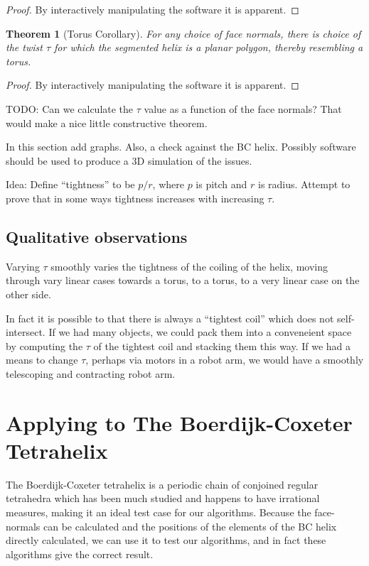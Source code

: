 \documentclass[11pt]{article}
\newtheorem{theorem}{Theorem}
\begin{document}
{\begin{proof}
  By interactively manipulating the software it is apparent.
  \end{proof}

\begin{theorem}[Torus Corollary]
  For any choice of face normals, there is choice of the twist $\tau$ for which the segmented helix is a planar polygon,
  thereby resembling a torus.
  \end{theorem}

\begin{proof}
  By interactively manipulating the software it is apparent.
  \end{proof}

TODO: Can we calculate the $\tau$ value as a function of the face normals? That would make a nice little constructive theorem.


In this section add graphs. Also, a check against the BC helix.
Possibly software should be used to produce a 3D simulation
of the issues.

Idea: Define ``tightness'' to be $ p / r$, where $p$ is pitch and $r$ is radius. Attempt to prove that in some ways tightness increases with increasing $\tau$.

\subsection{Qualitative observations}

Varying $\tau$ smoothly varies the tightness of the coiling of the helix, moving through vary linear cases towards a torus,
to a torus, to a very linear case on the other side.

In fact it is possible to that there is always a ``tightest coil'' which does not self-intersect. If we had many objects,
we could pack them into a conveneient space by computing the $\tau$ of the tightest coil and stacking them this way.
If we had a means to change $\tau$, perhaps via motors in a robot arm, we would have a smoothly telescoping and contracting
robot arm.


\section{Applying to The Boerdijk-Coxeter Tetrahelix}

The Boerdijk-Coxeter tetrahelix is a periodic chain of conjoined regular tetrahedra
which has been much studied\cite{coxeter1985simplicial,sadler2013periodic,fuller1982synergetics,read2018transforming} and happens to have irrational measures, making it an ideal
test case for our algorithms. Because the face-normals can be calculated and the
positions of the elements of the BC helix directly calculated, we can use
it to test our algorithms, and in fact these algorithms give the correct result.

}
\end{document}
